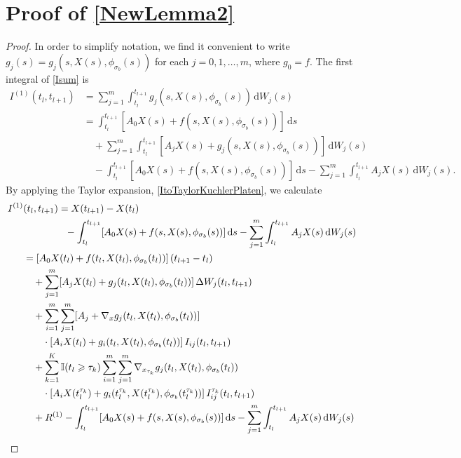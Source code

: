\documentclass[onefignum]{siamart250211}
\begin{document}
\section[Proof of integral expressions]{Proof of \cref{NewLemma2}}\label{ProofofNewLemma2}

\begin{proof}
In order to simplify notation, we find it convenient to write $g_j(s)=g_j(s,X(s),\phi_{\sigma_b}(s))$ for each $j=0,1,\ldots,m$, where $g_0=f$. The first integral of \cref{Isum} is
\begin{align*}
I^{(1)}(t_l,t_{l+1})&=\sum_{j=1}^m\int_{t_l}^{t_{l+1}}g_j(s,X(s),\phi_{\sigma_b}(s))\,\mathrm{d}W_j(s)\\
&=\int_{t_l}^{t_{l+1}}[A_0X(s)+f(s,X(s),\phi_{\sigma_b}(s))]\,\mathrm{d}s\\
&\quad+\sum_{j=1}^m\int_{t_l}^{t_{l+1}}[A_jX(s)+g_j(s,X(s),\phi_{\sigma_b}(s))]\,\mathrm{d}W_j(s)\\
&\quad-\int_{t_l}^{t_{l+1}}[A_0X(s)+f(s,X(s),\phi_{\sigma_b}(s))]\,\mathrm{d}s-\sum_{j=1}^m\int_{t_l}^{t_{l+1}}A_jX(s)\,\mathrm{d}W_j(s).
\end{align*}
By applying the Taylor expansion, \cref{ItoTaylorKuchlerPlaten}, we calculate
\begin{align}
I^{(1)}&(t_l,t_{l+1})=X(t_{l+1})-X(t_l)\nonumber\\
&\hspace{1.5cm}-\int_{t_l}^{t_{l+1}}[A_0X(s)+f(s,X(s),\phi_{\sigma_b}(s))]\,\mathrm{d}s-\sum_{j=1}^m\int_{t_l}^{t_{l+1}}A_jX(s)\,\mathrm{d}W_j(s)\nonumber\\
&=[A_0X(t_l)+f(t_l,X(t_l),\phi_{\sigma_b}(t_l))]\,(t_{l+1}-t_l)\nonumber\\
&\quad+\sum_{j=1}^m[A_jX(t_l)+g_j(t_l,X(t_l),\phi_{\sigma_b}(t_l))]\,\Delta W_j(t_l,t_{l+1})\nonumber\\
&\quad+\sum_{i=1}^m\sum_{j=1}^m[A_j+\nabla_xg_j(t_l,X(t_l),\phi_{\sigma_b}(t_l))]\nonumber\\
&\quad\quad\cdot[A_iX(t_l)+g_i(t_l,X(t_l),\phi_{\sigma_b}(t_l))]\,I_{ij}(t_l,t_{l+1})\nonumber\\
&\quad+\sum_{k=1}^K\mathbb{I}(t_l\geqslant\tau_k)\sum_{i=1}^m\sum_{j=1}^m\nabla_{x_{\tau_k}}g_j(t_l,X(t_l),\phi_{\sigma_b}(t_l))\nonumber\\
&\quad\quad\cdot[A_iX(t_l^{\tau_k})+g_i(t_l^{\tau_k},X(t_l^{\tau_k}),\phi_{\sigma_b}(t_l^{\tau_k}))]\,I_{ij}^{\tau_k}(t_l,t_{l+1})\nonumber\\
&\quad+R^{(1)}-\int_{t_l}^{t_{l+1}}[A_0X(s)+f(s,X(s),\phi_{\sigma_b}(s))]\,\mathrm{d}s-\sum_{j=1}^m\int_{t_l}^{t_{l+1}}A_jX(s)\,\mathrm{d}W_j(s)\nonumber\\

\end{align}
\end{proof}
\end{document}
